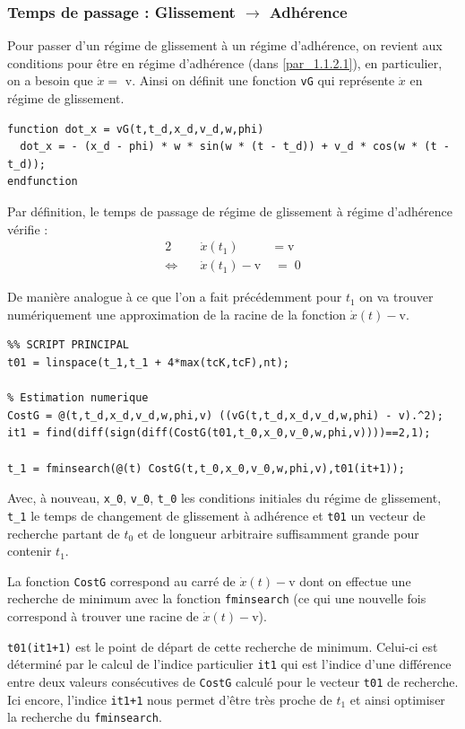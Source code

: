 \documentclass{article}
\begin{document}
\subsubsection{Temps de passage : Glissement $\rightarrow$ Adhérence}\label{sssec_2.2.2}
Pour passer d'un régime de glissement à un régime d'adhérence, on revient aux conditions pour être en régime d'adhérence (dans \ref{par_1.1.2.1}), en particulier, on a besoin que $\dot x = $ v.
Ainsi on définit une fonction \verb|vG| qui représente $\dot x$ en régime de glissement.
\begin{lstlisting}
function dot_x = vG(t,t_d,x_d,v_d,w,phi)
  dot_x = - (x_d - phi) * w * sin(w * (t - t_d)) + v_d * cos(w * (t - t_d));
endfunction
\end{lstlisting}

Par définition, le temps de passage de régime de glissement à régime d'adhérence vérifie :
\begin{alignat*}{2}
 &\dot{x}(t_1)\; &=\;\text{v}\\
\Longleftrightarrow \quad & \dot{x}(t_1)-\text{v}\;&=\;0
\end{alignat*}

De manière analogue à ce que l'on a fait précédemment pour $t_1$ on va trouver numériquement une approximation de la racine de la fonction $\dot x(t) -$v.

\begin{lstlisting}
%% SCRIPT PRINCIPAL
t01 = linspace(t_1,t_1 + 4*max(tcK,tcF),nt);

% Estimation numerique
CostG = @(t,t_d,x_d,v_d,w,phi,v) ((vG(t,t_d,x_d,v_d,w,phi) - v).^2);
it1 = find(diff(sign(diff(CostG(t01,t_0,x_0,v_0,w,phi,v))))==2,1);

t_1 = fminsearch(@(t) CostG(t,t_0,x_0,v_0,w,phi,v),t01(it+1));
\end{lstlisting}

Avec, à nouveau, \verb|x_0|, \verb|v_0|, \verb|t_0| les conditions initiales du régime de glissement, \verb|t_1| le temps de changement de glissement à adhérence et \verb|t01| un vecteur de recherche partant de $t_0$ et de longueur arbitraire suffisamment grande pour contenir $t_1$.

La fonction \verb|CostG| correspond au carré de $\dot x(t) -$v dont on effectue une recherche de minimum avec la fonction \verb|fminsearch| (ce qui une nouvelle fois correspond à trouver une racine de $\dot x(t) -$v). 

\verb|t01(it1+1)| est le point de départ de cette recherche de minimum. Celui-ci est déterminé par le calcul de l'indice particulier \verb|it1| qui est l'indice d'une différence entre deux valeurs consécutives de \verb|CostG| calculé pour le  vecteur \verb|t01| de recherche. Ici encore, l'indice \verb|it1+1| nous permet d'être très proche de $t_1$ et ainsi optimiser la recherche du \verb|fminsearch|.
\end{document}
